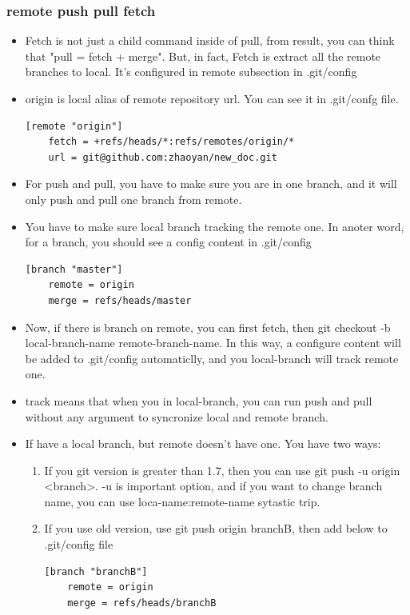 \documentclass[a4paper,11pt,twoside]{book}
\begin{document}
\subsubsection{remote push pull fetch}
\begin{itemize}
		\item Fetch is not just a child command inside of pull, from result, you can think that "pull = fetch + merge". But, in fact, Fetch is extract all the remote branches to local. It's configured in remote subsection in .git/config

		\item origin is local alias of remote repository url. You can see it in .git/confg file.  

\begin{verbatim}
[remote "origin"]
	fetch = +refs/heads/*:refs/remotes/origin/*
	url = git@github.com:zhaoyan/new_doc.git
\end{verbatim}
				
\item For push and pull, you have to make sure you are in one branch, and it will only push and pull one branch from remote. 

\item You have to make sure local branch tracking the remote one. In anoter word, for a branch, you should see a config content in .git/config
\begin{verbatim}
[branch "master"]
	remote = origin
	merge = refs/heads/master
\end{verbatim}
\item Now, if there is branch on remote, you can first fetch, then git checkout -b local-branch-name remote-branch-name. In this way, a configure content will be added to .git/config automaticlly, and you local-branch will track remote one.
\item track means that when you in local-branch, you can run push and pull without any argument to syncronize local and remote branch.

\item If have a local branch, but remote doesn't have one. You have two ways:
\begin{enumerate}
		\item If you git version is greater than 1.7, then you can use git push -u origin <branch>. -u is important option, and if you want to change branch name, you can use loca-name:remote-name sytastic trip.
		\item If you use old version, use git push origin branchB, then add below to .git/config file
\begin{verbatim}
[branch "branchB"]
    remote = origin
	merge = refs/heads/branchB
\end{verbatim}
\end{enumerate}


\end{itemize}
\end{document}
